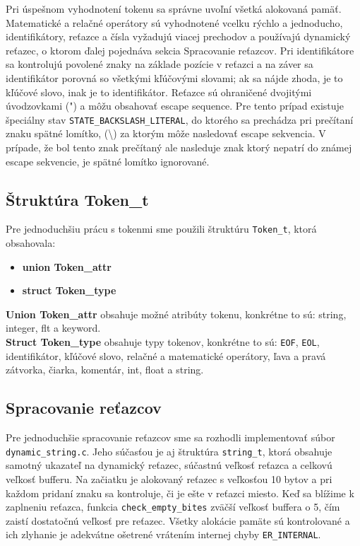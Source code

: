 \documentclass [11pt, a4paper]{article}
\begin{document}
Pri úspešnom vyhodnotení tokenu sa správne uvoľní všetká alokovaná pamäť. Matematické a relačné operátory sú vyhodnotené vcelku rýchlo a jednoducho, identifikátory, reťazce a čísla vyžadujú viacej prechodov a používajú dynamický reťazec, o ktorom ďalej pojednáva sekcia Spracovanie reťazcov. Pri identifikátore sa kontrolujú povolené znaky na základe pozície v reťazci a na záver sa identifikátor porovná so všetkými kľúčovými slovami; ak sa nájde zhoda, je to kľúčové slovo, inak je to identifikátor. Reťazce sú ohraničené dvojitými úvodzovkami (") a môžu obsahovať escape sequence. Pre tento prípad existuje špeciálny stav \texttt{STATE\_BACKSLASH\_LITERAL}, do ktorého sa prechádza pri  prečítaní znaku spätné lomítko, (\textbackslash) za ktorým môže nasledovať escape sekvencia. V prípade, že bol tento znak prečítaný ale nasleduje znak ktorý nepatrí  do známej escape sekvencie, je spätné lomítko ignorované.

\subsection{Štruktúra Token\_t}
Pre jednoduchšiu prácu s tokenmi sme použili štruktúru \texttt{Token\_t}, ktorá obsahovala:

\begin{itemize}
\item \textbf{union Token\_attr}
\item \textbf{struct Token\_type}
\end{itemize}
\textbf{Union Token\_attr} obsahuje možné atribúty tokenu, konkrétne to sú: string, integer, flt a keyword. \\
\textbf{Struct Token\_type} obsahuje typy tokenov, konkrétne to sú: \texttt{EOF}, \texttt{EOL}, identifikátor, kľúčové slovo, relačné a matematické operátory, ľava a pravá zátvorka, čiarka, komentár, int, float a string.


\subsection{Spracovanie reťazcov}
Pre jednoduchšie spracovanie reťazcov sme sa rozhodli implementovať súbor \texttt{dynamic\_string.c}. Jeho súčasťou je aj štruktúra \texttt{string\_t}, ktorá obsahuje samotný ukazateľ na dynamický reťazec, súčastnú veľkosť reťazca a celkovú veľkosť bufferu. Na začiatku je alokovaný reťazec s veľkosťou 10 bytov a pri každom pridaní znaku sa kontroluje, či je ešte v reťazci miesto. Keď sa blížime k zaplneniu reťazca, funkcia \texttt{check\_empty\_bites} zväčší veľkosť buffera o 5, čím zaistí dostatočnú veľkosť pre reťazec. Všetky alokácie pamäte sú kontrolované a ich zlyhanie je adekvátne ošetrené vrátením internej chyby \texttt{ER\_INTERNAL}.
\end{document}
